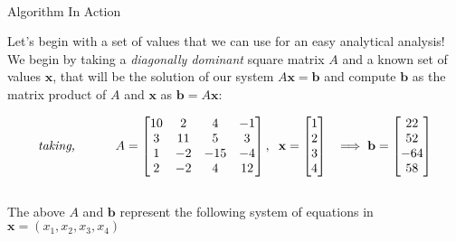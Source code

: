 \documentclass[main]{subfiles}
\begin{document}
    
    \\
    {\large Algorithm In Action}\\
    \vspace{15mm}

    \noindent Let's begin with a set of values that we can use for an easy analytical analysis!
        We begin by taking a \textit{diagonally dominant} square matrix $A$ and a known set of values 
        $\textbf{x}$, that will be the solution of our system $A\textbf{x} = \textbf{b}$ and compute
        $\textbf{b}$ as the matrix product of $A$ and $\textbf{x}$ as $\textbf{b} = A\textbf{x}$:

        \begin{equation}   
            \textit{taking, } \hspace{10mm} A = \begin{bmatrix}
                10 & 2 & 4 & -1 \\
                3 & 11 & 5 & 3 \\
                1 & -2 & -15 &-4 \\
                2 & -2 & 4 & 12 
            \end{bmatrix},\hspace{2mm}
            \textbf{x} = \begin{bmatrix}
                1 \\
                2 \\
                3 \\
                4 \\
            \end{bmatrix}
            \hspace{2mm}
        \implies \textbf{b} = \begin{bmatrix}
                22 \\
                52 \\
                -64\\
                58 \\
            \end{bmatrix}
        \end{equation}
\vspace{10mm}
\\
The above $A$ and $\textbf{b}$ represent the following system of equations in $\textbf{x} = (x_1, x_2, x_3, x_4)$  
\end{document}
